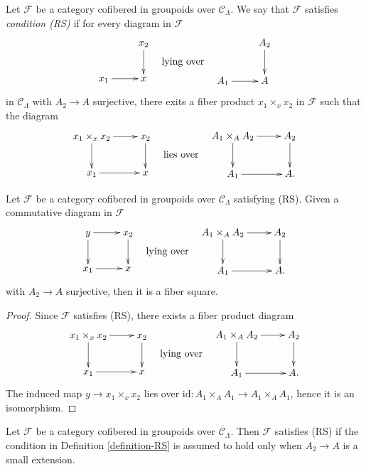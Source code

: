 \begin{definition}
\label{definition-RS}
Let $\mathcal{F}$ be a category cofibered in groupoids over $\mathcal
C_\Lambda$.  We say that $\mathcal{F}$ satisfies {\it condition (RS)}
if for every diagram in $\mathcal{F}$
$$
\vcenter{
\xymatrix{
           & x_2 \ar[d] \\
x_1 \ar[r] & x
}
}
\quad\text{lying over}\quad
\vcenter{
\xymatrix{
           & A_2 \ar[d] \\
A_1 \ar[r] & A
}
}
$$
in $\mathcal{C}_\Lambda$ with $A_2 \to A$ surjective, there exits a
fiber product $x_1 \times_x x_2$ in $\mathcal{F}$ such that the diagram
$$
\vcenter{
\xymatrix{
x_1 \times_x x_2 \ar[r] \ar[d] & x_2 \ar[d] \\
x_1 \ar[r]      & x
}
}
\quad\text{lies over}\quad
\vcenter{
\xymatrix{
A_1 \times_A A_2 \ar[r] \ar[d] & A_2 \ar[d] \\
A_1 \ar[r]      & A.
}
}
$$
\end{definition}

\begin{lemma}
\label{lemma-RS-fiber-square}
Let $\mathcal{F}$ be a category cofibered in groupoids over
$\mathcal{C}_\Lambda$ satisfying (RS). Given a commutative diagram
in $\mathcal{F}$
$$
\vcenter{
\xymatrix{
y \ar[r] \ar[d] & x_2 \ar[d]   \\
x_1 \ar[r]      & x
}
}
\quad\text{lying over}\quad
\vcenter{
\xymatrix{
A_1 \times_A A_2 \ar[r] \ar[d] & A_2 \ar[d] \\
A_1 \ar[r]      & A.
}
}
$$
with $A_2 \to A$ surjective, then it is a fiber square.
\end{lemma}

\begin{proof}
Since $\mathcal{F}$ satisfies (RS), there exists a fiber product diagram
$$
\vcenter{
\xymatrix{
x_1 \times_x x_2 \ar[r] \ar[d] & x_2 \ar[d] \\
x_1 \ar[r]      & x
}
}
\quad\text{lying over}\quad
\vcenter{
\xymatrix{
A_1 \times_A A_2 \ar[r] \ar[d] & A_2 \ar[d] \\
A_1 \ar[r]      & A.
}
}
$$
The induced map $y \to x_1 \times_x x_2$ lies over
$\text{id} : A_1 \times_A A_1 \to A_1 \times_A A_1$, hence it is an
isomorphism.
\end{proof}

\begin{lemma}
\label{lemma-RS-small-extension}
Let $\mathcal{F}$ be a category cofibered in groupoids over $\mathcal
C_\Lambda$. Then $\mathcal{F}$ satisfies (RS) if the condition in
Definition \ref{definition-RS} is assumed to hold only when $A_2 \to A$
is a small extension.
\end{lemma}

